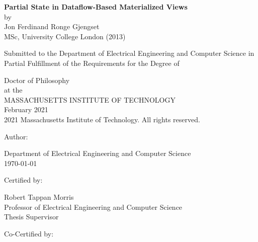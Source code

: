\documentclass[fontsize=12pt,paper=letter]{scrartcl}
\begin{document}
\begin{titlepage}
  \begin{center}
    \textbf{\large Partial State in Dataflow-Based Materialized Views}\\
    \vspace{0.5\baselineskip}
    by\\
    \vspace{0.5\baselineskip}
    {\large Jon Ferdinand Ronge Gjengset}\\
    \vspace{0.5\baselineskip}
    MSc, University College London (2013)\\
    \vspace{0.5\baselineskip}
    \begin{addmargin}[0.1in]{0.1in}
      \centering
      Submitted to the Department of
      Electrical Engineering and Computer Science
      in Partial Fulfillment of the Requirements for the Degree of\\
    \end{addmargin}
    \vspace{0.5\baselineskip}
    Doctor of Philosophy\\
    \vspace{0.5\baselineskip}
    at the\\
    \vspace{0.5\baselineskip}
    MASSACHUSETTS INSTITUTE OF TECHNOLOGY\\
    \vspace{0.5\baselineskip}
    February 2021\\
    \textcopyright{} 2021 Massachusetts Institute of Technology.
    All rights reserved.
  \end{center}

  \vspace{\baselineskip}
  {
  \raggedright
  Author: \dotfill

  \raggedleft
  Department of Electrical Engineering and Computer Science\\
  \today{}\\
  }

  \vspace{\baselineskip}
  {
  \raggedright
  Certified by: \dotfill

  \raggedleft
  Robert Tappan Morris\\
  Professor of Electrical Engineering and Computer Science\\
  Thesis Supervisor\\
  }

  \vspace{\baselineskip}
  {
  \raggedright
  Co-Certified by: \dotfill

}
\end{titlepage}
\end{document}
